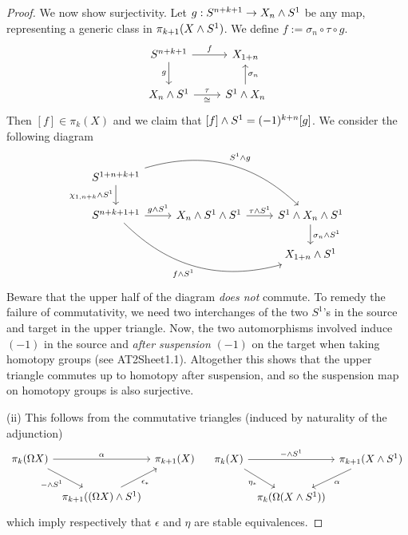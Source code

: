\begin{proof}
We now show surjectivity. Let $g:S^{n+k+1}\to X_n\wedge S^1$ be any map, representing a generic class in $\pi_{k+1}(X\wedge S^1)$. We define $f:=\sigma_n\circ\tau\circ g$.
\[
\begin{tikzcd}
S^{n+k+1} \ar[d,"g"'] \ar[r,"f"] & X_{1+n}\\
X_n\smsh S^1 \ar[r,"\tau","\cong"'] & S^1\smsh X_n \ar[u,"\sigma_n"']
\end{tikzcd}
\]
Then $[f]\in\pi_k(X)$ and we claim that $[f]\wedge S^1=(-1)^{k+n}[g]$. We consider the following diagram
\[
\begin{tikzcd}
S^{1+n+k+1} \arrow[d, "\chi_{1,n+k} \wedge S^1", swap] \arrow[rrd, "S^1 \wedge g", bend left]\\
S^{n+k+1+1} \arrow[rrd, "f \wedge S^1", swap, bend right] \arrow[r, "g \wedge S^1"] & X_n \wedge S^1 \wedge S^1 \arrow[r, "\tau \wedge S^1"] & S^1 \wedge X_n \wedge S^1 \arrow[d, "\sigma_n \wedge S^1"]\\
 & & X_{1+n} \wedge S^1
\end{tikzcd}
\]
Beware that the upper half of the diagram \emph{does not} commute. To remedy the failure of commutativity, we need two interchanges of the two $S^1$'s in the source and target in the upper triangle. Now, the two automorphisms involved induce $(-1)$ in the source and \emph{after suspension} $(-1)$ on the target when taking homotopy groups (see AT2Sheet1.1).  Altogether this shows that the upper triangle commutes up to homotopy after suspension, and so the suspension map on homotopy groups is also surjective.

(ii) This follows from the commutative triangles (induced by naturality of the adjunction)
\[
\begin{tikzcd}[column sep=1ex]
\pi_k(\Omega X) \arrow[rr, "\alpha"] \arrow[dr, "- \wedge S^1", swap] & & \pi_{k+1}(X)
\\ & \pi_{k+1}((\Omega X) \wedge S^1) \arrow[ur, "\epsilon_*", swap]
\end{tikzcd}\quad
\begin{tikzcd}[column sep=1ex]
\pi_k(X) \arrow[rr, "- \wedge S^1"] \arrow[rd, "\eta_*", swap] & & \pi_{k+1}(X \wedge S^1) \arrow[dl, "\alpha", swap, swap]
\\ & \pi_k(\Omega(X \wedge S^1))
\end{tikzcd}
\]
which imply respectively that $\epsilon$ and $\eta$ are stable equivalences.


\end{proof}
